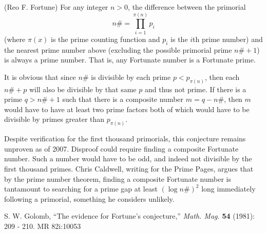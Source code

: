 \documentclass[12pt]{article}
\begin{document}
(Reo F. Fortune) For any integer $n > 0$, the difference between the primorial $$n\# = \prod_{i = 1}^{\pi(n)} p_i$$ (where $\pi(x)$ is the prime counting function and $p_i$ is the $i$th prime number) and the nearest prime number above (excluding the possible primorial prime $n\# + 1$) is always a prime number. That is, any Fortunate number is a Fortunate prime.

It is obvious that since $n\#$ is divisible by each prime $p < p_{\pi(n)}$, then each $n\# + p$ will also be divisible by that same $p$ and thus not prime. If there is a prime $q > n\# + 1$ such that there is a composite number $m = q - n\#$, then $m$ would have to have at least two prime factors both of which would have to be divisible by primes greater than $p_{\pi(n)}$.

Despite verification for the first thousand primorials, this conjecture remains unproven as of 2007. Disproof could require finding a composite Fortunate number. Such a number would have to be odd, and indeed not divisible by the first thousand primes. Chris Caldwell, writing for the Prime Pages, argues that by the prime number theorem, finding a composite Fortunate number is tantamount to searching for a prime gap at least $(\log n\#)^2$ long immediately following a primorial, something he considers unlikely.

\begin{thebibliography}{1}
 S. W. Golomb, ``The evidence for Fortune's conjecture,'' {\it Math. Mag.} {\bf 54} (1981): 209 - 210. MR 82i:10053 
\end{thebibliography}
\end{document}
